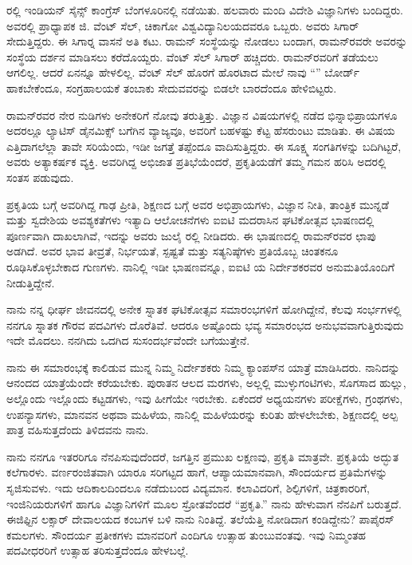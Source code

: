 ರಲ್ಲಿ ಇಂಡಿಯನ್ ಸೈನ್ಸ್ ಕಾಂಗ್ರೆಸ್ ಬೆಂಗಳೂರಿನಲ್ಲಿ ನಡೆಯಿತು. ಹಲವಾರು ಮಂದಿ ವಿದೇಶಿ ವಿಜ್ಞಾನಿಗಳು ಬಂದಿದ್ದರು. ಅವರಲ್ಲಿ ಪ್ರಾಧ್ಯಾಪಕ ಜಿ. ವೆಂಟ್ ಸೆಲ್, ಚಿಕಾಗೋ ವಿಶ್ವವಿದ್ಯಾನಿಲಯದವರೂ ಒಬ್ಬರು. ಅವರು ಸಿಗಾರ್ ಸೇದುತ್ತಿದ್ದರು. ಈ ಸಿಗಾರ್‍ನ ವಾಸನೆ ಅತಿ ಕಟು. ರಾಮನ್ ಸಂಸ್ಥೆಯನ್ನು ನೋಡಲು ಬಂದಾಗ, ರಾಮನ್‍ರವರೇ ಅವರನ್ನು ಸಂಸ್ಥೆಯ ದರ್ಶನ ಮಾಡಿಸಲು ಕರೆದೊಯ್ದರು. ವೆಂಟ್ ಸೆಲ್ ಸಿಗಾರ್ ಹಚ್ಚಿದರು. ರಾಮನ್‍ರವರಿಗೆ ತಡೆಯಲು ಆಗಲಿಲ್ಲ. ಆದರೆ ಏನನ್ನೂ ಹೇಳಲಿಲ್ಲ. ವೆಂಟ್ ಸೆಲ್ ಹೊರಗೆ ಹೊರಟಾದ ಮೇಲೆ ನಾವು “” ಬೋರ್ಡ್ ಹಾಕಬೇಕೆಂದೂ, ಸಂಗ್ರಹಾಲಯಕೆ ತಂಬಾಕು ಸೇದುವವರನ್ನು ಬಿಡಲೇ ಬಾರದೆಂದೂ ಹೇಳಿಬಿಟ್ಟರು.

\vskip 2pt

ರಾಮನ್‍ರವರ ನೇರ ನುಡಿಗಳು ಅನೇಕರಿಗೆ ನೋವು ತರುತ್ತಿತ್ತು. ವಿಜ್ಞಾನ ವಿಷಯಗಳಲ್ಲಿ ನಡೆದ ಭಿನ್ನಾಭಿಪ್ರಾಯಗಳೂ ಅದರಲ್ಲೂ ಲ್ಯಾಟಿಸ್ ಡೈನಮಿಕ್ಸ್ ಬಗೆಗಿನ ವ್ಯಾಜ್ಯವೂ, ಅವರಿಗೆ ಬಹಳಷ್ಟು ಕೆಟ್ಟ ಹೆಸರುಂಟು ಮಾಡಿತು. ಈ ವಿಷಯ ಎತ್ತಿದಾಗಲೆಲ್ಲಾ ತಾವೇ ಸರಿಯೆಂದು, ಇಡೀ ಜಗತ್ತೆ ತಪ್ಪೆಂದೂ ವಾದಿಸುತ್ತಿದ್ದರು. ಈ ಸೂಕ್ಷ್ಮ ಸಂಗತಿಗಳನ್ನು ಬದಿಗಿಟ್ಟರೆ, ಅವರು ಅತ್ಯಾಕರ್ಷಕ ವ್ಯಕ್ತಿ. ಅವರಿಗಿದ್ದ ಅಭಿಜಾತ ಪ್ರತಿಭೆಯೆಂದರೆ, ಪ್ರಕೃತಿಯಡೆಗೆ ತಮ್ಮ ಗಮನ ಹರಿಸಿ ಅದರಲ್ಲಿ ಸಂತಸ ಪಡುವುದು.

\vskip 2pt

ಪ್ರಕೃತಿಯ ಬಗ್ಗೆ ಅವರಿಗಿದ್ದ ಗಾಢ ಪ್ರೀತಿ, ಶಿಕ್ಷಣದ ಬಗ್ಗೆ ಅವರ ಅಭಿಪ್ರಾಯಗಳು, ವಿಜ್ಞಾನ ನೀತಿ, ತಾಂತ್ರಿಕ ಮುನ್ನಡೆ ಮತ್ತು ಸ್ವದೇಶಿಯ ಅವಶ್ಯಕತೆಗಳು ಇತ್ಯಾದಿ ಆಲೋಚನೆಗಳು ಐಐಟಿ ಮದರಾಸಿನ ಘಟಿಕೋತ್ಸವ ಭಾಷಣದಲ್ಲಿ ಪೂರ್ಣವಾಗಿ ದಾಖಲಾಗಿವೆ, ಇದನ್ನು ಅವರು  ಜುಲೈ ರಲ್ಲಿ ನೀಡಿದರು. ಈ ಭಾಷಣದಲ್ಲಿ ರಾಮನ್‍ರವರ ಛಾಪು ಅಡಗಿದೆ. ಅವರ ಭಾವ ತೀವ್ರತೆ, ನಿರ್ಭಯತೆ, ಸ್ಪಷ್ಟತೆ ಮತ್ತು ಸತ್ಯನಿಷ್ಠೆಗಳು ಪ್ರತಿಯೊಬ್ಬ ಚಿಂತಕನೂ ರೂಢಿಸಿಕೊಳ್ಳಬೇಕಾದ ಗುಣಗಳು. ನಾನಿಲ್ಲಿ ಇಡೀ ಭಾಷಣವನ್ನೂ, ಐಐಟಿ ಯ ನಿರ್ದೇಶಕರವರ ಅನುಮತಿಯೊಂದಿಗೆ ನೀಡುತ್ತಿದ್ದೇನೆ.



ನಾನು ನನ್ನ ಧೀರ್ಘ ಜೀವನದಲ್ಲಿ ಅನೇಕ ಸ್ನಾತಕ ಘಟಿಕೋತ್ಸವ ಸಮಾರಂಭಗಳಿಗೆ ಹೋಗಿದ್ದೇನೆ, ಕೆಲವು ಸಂರ್ಭಗಳಲ್ಲಿ ನನಗೂ ಸ್ನಾತಕ ಗೌರವ ಪದವಿಗಳು ದೊರೆತಿವೆ. ಆದರೂ ಅಷ್ಟೊಂದು ಭವ್ಯ ಸಮಾರಂಭದ ಅನುಭವವಾಗುತ್ತಿರುವುದು ಇದೇ ಮೊದಲು. ನನಗಿದು ಒದಗಿದ ಸುಸಂದರ್ಭವೆಂದೇ ಬಗೆಯುತ್ತೇನೆ.

ನಾನು ಈ ಸಮಾರಂಭಕ್ಕೆ ಕಾಲಿಡುವ ಮುನ್ನ ನಿಮ್ಮ ನಿರ್ದೇಶಕರು ನಿಮ್ಮ ಕ್ಯಾಂಪಸ್‍ನ ಯಾತ್ರೆ ಮಾಡಿಸಿದರು. ನಾನಿದನ್ನು ಆನಂದದ ಯಾತ್ರೆಯೆಂದೇ ಕರೆಯಬೇಕು. ಪುರಾತನ ಆಲದ ಮರಗಳು, ಅಲ್ಲಲ್ಲಿ ಮುಳ್ಳುಗಂಟಿಗಳು, ಸೊಗಸಾದ ಹುಲ್ಲು, ಅಲ್ಲೊಂದು ಇಲ್ಲೊಂದು ಕಟ್ಟಡಗಳು, ಇವು ಹೀಗೆಯೇ ಇರಬೇಕು. ಏಕೆಂದರೆ ಅಧ್ಯಯನಗಳು ಪರೀಕ್ಷೆಗಳು, ಗ್ರಂಥಗಳು, ಉಪನ್ಯಾಸಗಳು, ಮಾನವನ ಅಥವಾ ಮಹಿಳೆಯ, ನಾನಿಲ್ಲಿ ಮಹಿಳೆಯರನ್ನು ಕುರಿತು ಹೇಳಲೇಬೇಕು, ಶಿಕ್ಷಣದಲ್ಲಿ ಅಲ್ಪ ಪಾತ್ರ ವಹಿಸುತ್ತದೆಂದು ತಿಳಿದವನು ನಾನು.

\newpage

ನಾನು ನನಗೂ ಇತರರಿಗೂ ನೆನಪಿಸುವುದೆಂದರೆ, ಜಗತ್ತಿನ ಪ್ರಮುಖ ಲಕ್ಷಣವು, ಪ್ರಕೃತಿ ಮಾತ್ರವೇ. ಪ್ರಕೃತಿಯೆ ಅದ್ಭುತ ಕಲೆಗಾರಳು. ವರ್ಣರಂಜಿತವಾಗಿ ಯಾರೂ ಸರಿಗಟ್ಟದ ಹಾಗೆ, ಆಪ್ಯಾಯಮಾನವಾಗಿ, ಸೌಂದರ್ಯದ ಪ್ರತಿಮೆಗಳನ್ನು ಸೃಜಿಸುವಳು. ಇದು ಆದಿಕಾಲದಿಂದಲೂ ನಡೆದುಬಂದ ವಿದ್ಯಮಾನ. ಕಲಾವಿದರಿಗೆ, ಶಿಲ್ಪಿಗಳಿಗೆ, ಚಿತ್ರಕಾರರಿಗೆ, ಇಂಜಿನಿಯರುಗಳಿಗೆ ಹಾಗೂ ವಿಜ್ಞಾನಿಗಳಿಗೆ ಮೂಲ ಸ್ರೋತವೆಂದರೆ “ಪ್ರಕೃತಿ.” ನಾನು ಹೇಳುವಾಗ ನೆನಪಿಗೆ ಬರುತ್ತದೆ. ಈಜಿಫ್ಟಿನ ಲಕ್ಸಾರ್ ದೇವಾಲಯದ ಕಂಬಗಳ ಬಳಿ ನಾನು ನಿಂತಿದ್ದೆ. ತಲೆಯೆತ್ತಿ ನೋಡಿದಾಗ ಕಂಡಿದ್ದೇನು? ಪಾಪೈರಸ್ ಕಮಲಗಳು. ಸೌಂದರ್ಯ ಪ್ರತೀಕಗಳು ಮಾನವರಿಗೆ ಎಂದಿಗೂ ಉತ್ಸಾಹ ತುಂಬುವಂತವು. ಇವು ನಿಮ್ಮಂತಹ ಪದವೀಧರರಿಗೆ ಉತ್ಸಾಹ ತರಿಸುತ್ತದೆಂದೂ ಹೇಳಬಲ್ಲೆ.

